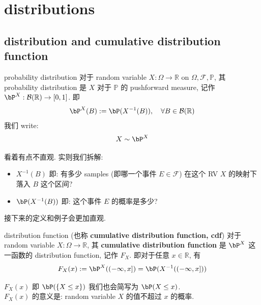 \section{distributions}
\subsection{distribution and cumulative distribution function}
\begin{definition}{probability distribution}
    对于 random variable \(X: \Omega \to \mathbb{R}\) on \(\Omega, \mathcal{F}, \mathbb{P}\), 
    其 probability distribution 是 \(X\) 对于 \(\mathbb{P}\) 的 pushforward measure, 
    记作 \(\bP^X: \mathcal{B}(\mathbb{R}) \to [0,1]\). 即
    \[
    \bP^X(B) := \bP(X^{-1}(B)), \quad \forall B \in \mathcal{B}(\mathbb{R})
    \]
    我们 write:
    \[
    X \sim \bP^X
    \]
\end{definition}
\begin{remark}
    看着有点不直观. 实则我们拆解:
    \begin{itemize}
        \item \(X^{-1}(B)\) 即: 有多少 samples (即哪一个事件 \(E\in\mathcal{F}\)) 在这个 RV $X$ 的映射下落入 \(B\) 这个区间?
        \item \(\bP(X^{-1}(B))\) 即: 这个事件 \(E\) 的概率是多少?
    \end{itemize}
    接下来的定义和例子会更加直观.
\end{remark}
\begin{definition}{distribution function (也称 \textbf{cumulative distribution function, cdf})}
    对于 random variable \(X: \Omega \to \mathbb{R}\), 
    其 \textbf{cumulative distribution function} 是 \(\bP^X\) 这一函数的 distribution function, 
    记作 \(F_X\). 即对于任意 \(x \in \mathbb{R}\), 有
    \[
    F_X(x) := \bP^X((-\infty,x]) = \bP(X^{-1}((-\infty,x]))
    \]
\end{definition}
\begin{remark}
    \(F_X(x)\) 即 \(\bP(\{X\leq x\})\) 我们也会简写为 \(\bP(X \leq x)\).\\
    \(F_X(x)\) 的意义是: random variable \(X\) 的值不超过 \(x\) 的概率.\\
\end{remark}


